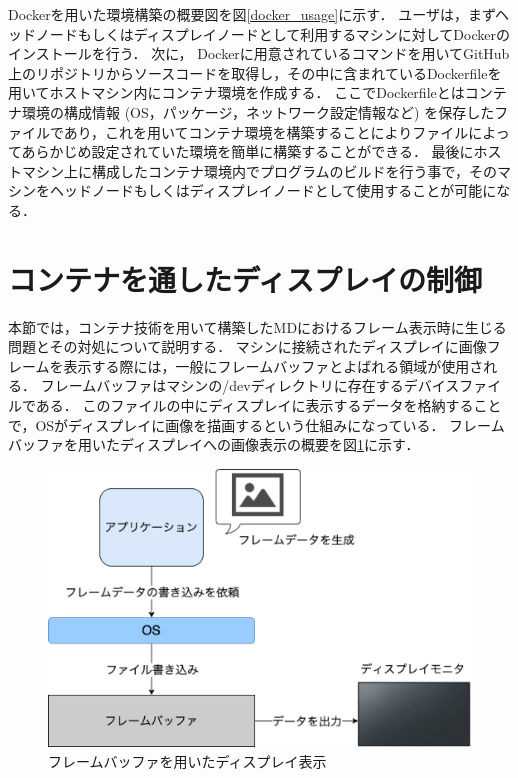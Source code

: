 Dockerを用いた環境構築の概要図を図\ref{docker_usage}に示す．
ユーザは，まずヘッドノードもしくはディスプレイノードとして利用するマシンに対してDockerのインストールを行う．
次に， Dockerに用意されているコマンドを用いてGitHub \cite{github}上のリポジトリからソースコードを取得し，その中に含まれているDockerfileを用いてホストマシン内にコンテナ環境を作成する．
ここでDockerfileとはコンテナ環境の構成情報 (OS，パッケージ，ネットワーク設定情報など) を保存したファイルであり，これを用いてコンテナ環境を構築することによりファイルによってあらかじめ設定されていた環境を簡単に構築することができる．
最後にホストマシン上に構成したコンテナ環境内でプログラムのビルドを行う事で，そのマシンをヘッドノードもしくはディスプレイノードとして使用することが可能になる．

\section{コンテナを通したディスプレイの制御}
本節では，コンテナ技術を用いて構築したMDにおけるフレーム表示時に生じる問題とその対処について説明する．
マシンに接続されたディスプレイに画像フレームを表示する際には，一般にフレームバッファとよばれる領域が使用される．
フレームバッファはマシンの/devディレクトリに存在するデバイスファイルである．
このファイルの中にディスプレイに表示するデータを格納することで，OSがディスプレイに画像を描画するという仕組みになっている．
フレームバッファを用いたディスプレイへの画像表示の概要を図\ref{framebuffer}に示す．

\begin{figure}[H]
    \hspace*{\fill}
    \includegraphics[width=\linewidth]{./fig/chap3/framebuffer.eps}
    \hspace*{\fill}
    \caption{フレームバッファを用いたディスプレイ表示}
    \label{framebuffer}
\end{figure}

